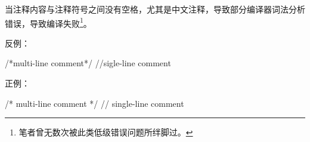 \begin{content}
当注释内容与注释符号之间没有空格，尤其是中文注释，导致部分编译器词法分析错误，导致编译失败\footnote{笔者曾无数次被此类低级错误问题所绊脚过。}。

反例：
\begin{leftbar}
\begin{c++}
/*multi-line comment*/
//sigle-line comment
\end{c++}
\end{leftbar}

正例：
\begin{leftbar}
\begin{c++}
/* multi-line comment */
// single-line comment
\end{c++}
\end{leftbar}

\end{content}
